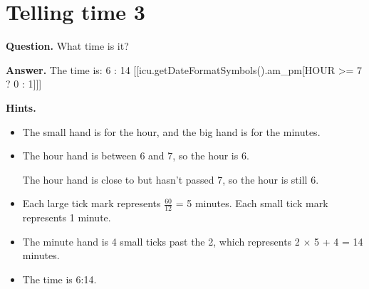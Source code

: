 \documentclass{article}
\begin{document}
\section*{Telling time 3}
\textbf{Question.} What time is it?

\textbf{Answer.} The time is:
                        6 :
                        14 [[icu.getDateFormatSymbols().am\_pm[HOUR >= 7 ? 0 : 1]]]

\textbf{Hints.}
\begin{itemize}
  \item The small hand is for the hour, and the big hand is for the minutes.
  \item The hour hand is between 6 and 7,
                            so the hour is 6.
                        
                        
                            The hour hand is close to but hasn't passed 7,
                            so the hour is still 6.
  \item Each large tick mark represents $\frac{60}{12}$ = 5 minutes.
                        Each small tick mark represents 1 minute.
  \item The minute hand is 4 small ticks past the
                                2,
                                which represents 2 $\times$ 5 + 4 = 14 minutes.
  \item The time is 6:14.
\end{itemize}
\end{document}
